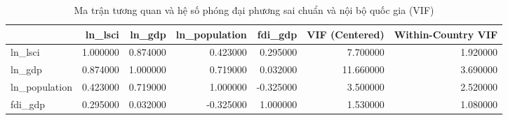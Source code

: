 \begin{table}
\caption{Ma trận tương quan và hệ số phóng đại phương sai chuẩn và nội bộ quốc gia (VIF)}
\label{tab:corr_vif}
\begin{tabular}{lrrrrrr}
\toprule
 & ln_lsci & ln_gdp & ln_population & fdi_gdp & VIF (Centered) & Within-Country VIF \\
\midrule
ln_lsci & 1.000000 & 0.874000 & 0.423000 & 0.295000 & 7.700000 & 1.920000 \\
ln_gdp & 0.874000 & 1.000000 & 0.719000 & 0.032000 & 11.660000 & 3.690000 \\
ln_population & 0.423000 & 0.719000 & 1.000000 & -0.325000 & 3.500000 & 2.520000 \\
fdi_gdp & 0.295000 & 0.032000 & -0.325000 & 1.000000 & 1.530000 & 1.080000 \\
\bottomrule
\end{tabular}
\end{table}
